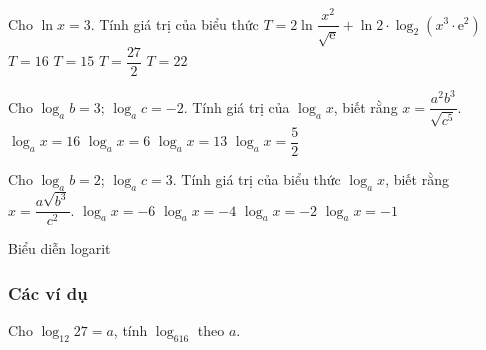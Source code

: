 \begin{ex}%
	Cho $\ln x=3$. Tính giá trị của biểu thức $T=2\ln\dfrac{x^2}{\sqrt{\mathrm{e}}}+\ln 2\cdot\log_2\left(x^3\cdot\mathrm{e}^2\right)$ 
	\choice
	{$T=16$}
	{$T=15$}
	{$T=\dfrac{27}{2}$}
	{\True $T=22$}
\end{ex}

\begin{ex}%
	Cho $\log_ab=3$; $\log_ac=-2$. Tính giá trị của $\log_ax$, biết rằng $x=\dfrac{a^2b^3}{\sqrt{c^5}}$. 
	\choice
	{\True $\log_ax=16$}
	{$\log_ax=6$}
	{$\log_ax=13$}
	{$\log_ax=\dfrac{5}{2}$}
\end{ex}

\begin{ex}%
	Cho $\log_ab=2$; $\log_ac=3$. Tính giá trị của biểu thức $\log_ax$, biết rằng $x=\dfrac{a\sqrt{b^3}}{c^2}$.
	\choice
	{$\log_ax=-6$}
	{$\log_ax=-4$}
	{\True $\log_ax=-2$}
	{$\log_ax=-1$}
\end{ex}





\begin{dang}{Biểu diễn logarit}
\end{dang}
\subsubsection{Các ví dụ}
		
\begin{vd}%
	Cho $\log_{12}27=a$, tính $\log_616$ theo $a$.
\end{vd}

